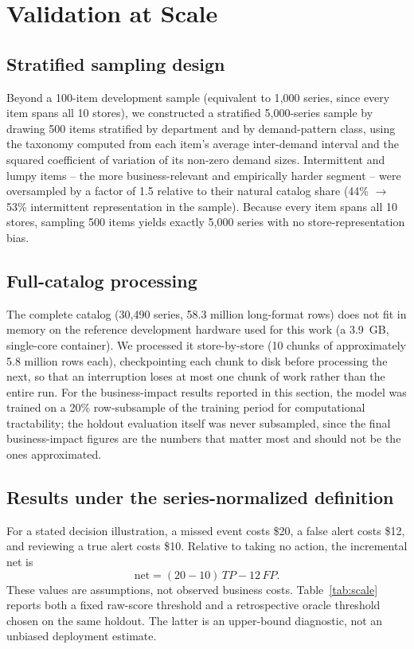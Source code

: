 \documentclass[11pt]{article}
\begin{document}
\section{Validation at Scale}
\label{sec:scale}

\subsection{Stratified sampling design}

Beyond a 100-item development sample (equivalent to 1{,}000 series, since every item spans all 10 stores), we constructed a stratified 5{,}000-series sample by drawing 500 items stratified by department and by demand-pattern class, using the \citet{syntetos2005categorization} taxonomy computed from each item's average inter-demand interval and the squared coefficient of variation of its non-zero demand sizes. Intermittent and lumpy items -- the more business-relevant and empirically harder segment -- were oversampled by a factor of 1.5 relative to their natural catalog share (44\% $\rightarrow$ 53\% intermittent representation in the sample). Because every item spans all 10 stores, sampling 500 items yields exactly 5{,}000 series with no store-representation bias.

\subsection{Full-catalog processing}

The complete catalog (30{,}490 series, 58.3 million long-format rows) does not fit in memory on the reference development hardware used for this work (a 3.9~GB, single-core container). We processed it store-by-store (10 chunks of approximately 5.8 million rows each), checkpointing each chunk to disk before processing the next, so that an interruption loses at most one chunk of work rather than the entire run. For the business-impact results reported in this section, the model was trained on a 20\% row-subsample of the training period for computational tractability; the holdout evaluation itself was never subsampled, since the final business-impact figures are the numbers that matter most and should not be the ones approximated.

\subsection{Results under the series-normalized definition}

For a stated decision illustration, a missed event costs \$20, a false alert costs \$12, and reviewing a true alert costs \$10. Relative to taking no action, the incremental net is
\begin{equation}
\text{net}= (20-10)\,TP - 12\,FP.
\end{equation}
These values are assumptions, not observed business costs. Table~\ref{tab:scale} reports both a fixed raw-score threshold and a retrospective oracle threshold chosen on the same holdout. The latter is an upper-bound diagnostic, not an unbiased deployment estimate.
\end{document}

